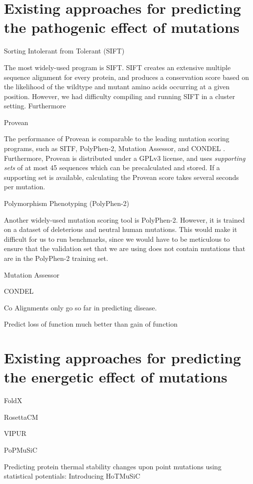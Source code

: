 \section{Existing approaches for predicting the pathogenic effect of mutations}

Sorting Intolerant from Tolerant (SIFT)

The most widely-used program is SIFT. SIFT creates an extensive multiple sequence alignment for every protein, and produces a conservation score based on the likelihood of the wildtype and mutant amino acids occurring at a given position. However, we had difficulty compiling and running SIFT in a cluster setting. Furthermore


Provean

The performance of Provean is comparable to the leading mutation scoring programs, such as SITF, PolyPhen-2, Mutation Assessor, and CONDEL \cite{choi_predicting_2012}. Furthermore, Provean is distributed under a GPLv3 license, and uses \textit{supporting sets} of at most 45 sequences which can be precalculated and stored. If a supporting set is available, calculating the Provean score takes several seconds per mutation.


Polymorphism Phenotyping (PolyPhen-2)

Another widely-used mutation scoring tool is PolyPhen-2. However, it is trained on a dataset of deleterious and neutral human mutations. This would make it difficult for us to run benchmarks, since we would have to be meticulous to ensure that the validation set that we are using does not contain mutations that are in the PolyPhen-2 training set.


Mutation Assessor


CONDEL

Co
Alignments only go so far in predicting disease.


Predict loss of function much better than gain of function



\section{Existing approaches for predicting the energetic effect of mutations}


FoldX


RosettaCM


VIPUR

PoPMuSiC


Predicting protein thermal stability changes upon point mutations using statistical potentials: Introducing HoTMuSiC


